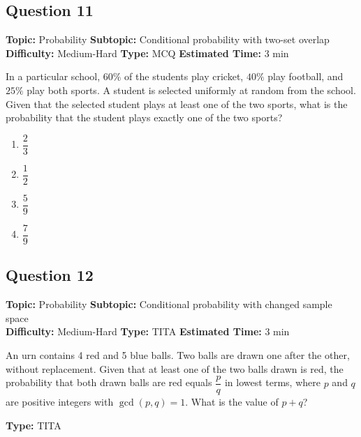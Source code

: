 \documentclass[11pt,a4paper]{article}
\begin{document}
\subsection*{Question 11}
\textbf{Topic:} Probability \quad
\textbf{Subtopic:} Conditional probability with two-set overlap \\
\textbf{Difficulty:} Medium-Hard \quad
\textbf{Type:} MCQ \quad
\textbf{Estimated Time:} 3 min
\begin{tcolorbox}[qbox]
In a particular school, \(60\%\) of the students play cricket, \(40\%\) play football, and \(25\%\) play both sports. A student is selected uniformly at random from the school. Given that the selected student plays at least one of the two sports, what is the probability that the student plays exactly one of the two sports?
\end{tcolorbox}
\begin{enumerate}[label=(\Alph*)]
\item \(\dfrac{2}{3}\)
\item \(\dfrac{1}{2}\)
\item \(\dfrac{5}{9}\)
\item \(\dfrac{7}{9}\)
\end{enumerate}

\subsection*{Question 12}
\textbf{Topic:} Probability \quad
\textbf{Subtopic:} Conditional probability with changed sample space \\
\textbf{Difficulty:} Medium-Hard \quad
\textbf{Type:} TITA \quad
\textbf{Estimated Time:} 3 min
\begin{tcolorbox}[qbox]
An urn contains 4 red and 5 blue balls. Two balls are drawn one after the other, without replacement. Given that at least one of the two balls drawn is red, the probability that both drawn balls are red equals \(\dfrac{p}{q}\) in lowest terms, where \(p\) and \(q\) are positive integers with \(\gcd(p,q)=1\). What is the value of \(p + q\)?
\end{tcolorbox}
\textbf{Type:} TITA

\end{document}
